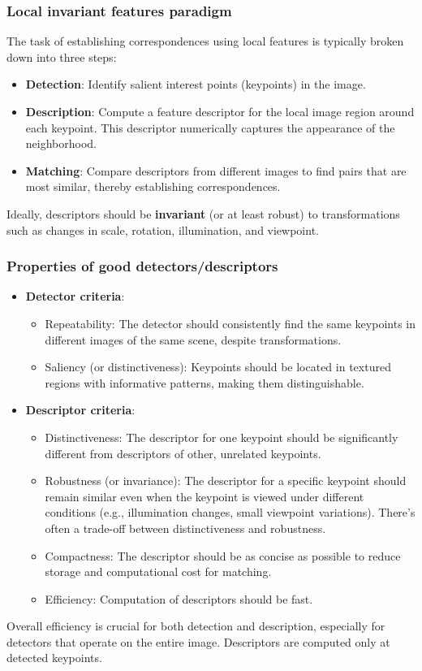 \subsubsection{Local invariant features paradigm}
The task of establishing correspondences using local features is typically broken down into three steps:
\begin{itemize}
  \item \textbf{Detection}: Identify salient interest points (keypoints) in the image.
  \item \textbf{Description}: Compute a feature descriptor for the local image region around each keypoint. This descriptor numerically captures the appearance of the neighborhood.
  \item \textbf{Matching}: Compare descriptors from different images to find pairs that are most similar, thereby establishing correspondences.
\end{itemize}
Ideally, descriptors should be \textbf{invariant} (or at least robust) to transformations such as changes in scale, rotation, illumination, and viewpoint.

\subsubsection{Properties of good detectors/descriptors}
\begin{itemize}
  \item \textbf{Detector criteria}:
  \begin{itemize}
    \item Repeatability: The detector should consistently find the same keypoints in different images of the same scene, despite transformations.
    \item Saliency (or distinctiveness): Keypoints should be located in textured regions with informative patterns, making them distinguishable.
  \end{itemize}
  \item \textbf{Descriptor criteria}:
  \begin{itemize}
    \item Distinctiveness: The descriptor for one keypoint should be significantly different from descriptors of other, unrelated keypoints.
    \item Robustness (or invariance): The descriptor for a specific keypoint should remain similar even when the keypoint is viewed under different conditions (e.g., illumination changes, small viewpoint variations). There's often a trade-off between distinctiveness and robustness.
    \item Compactness: The descriptor should be as concise as possible to reduce storage and computational cost for matching.
    \item Efficiency: Computation of descriptors should be fast.
  \end{itemize}
\end{itemize}
Overall efficiency is crucial for both detection and description, especially for detectors that operate on the entire image. Descriptors are computed only at detected keypoints.

